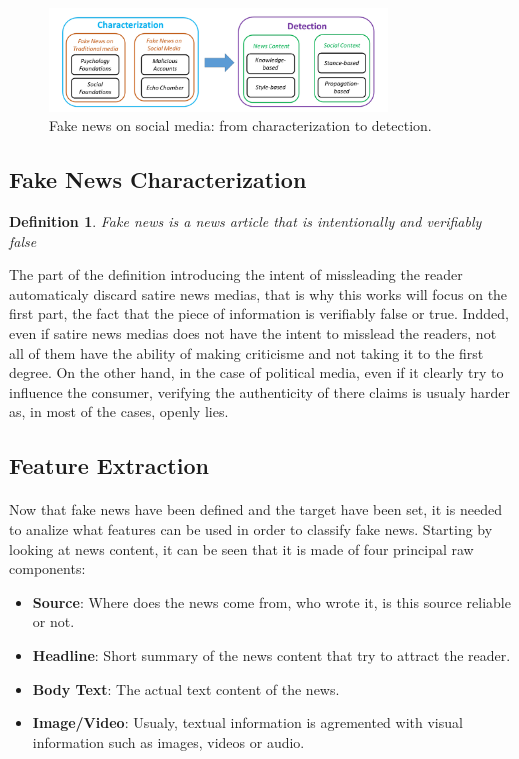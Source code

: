 \begin{figure}
	\centering
	\includegraphics[width=0.8\textwidth]{chapter/images/introduction/characterization.png}
	\caption{Fake news on social media: from characterization to detection.\cite{shu2017fake}}
	\label{fig:intro:characterization}
\end{figure}

\subsection{Fake News Characterization}
\newtheorem{def:fake_news}{Definition}

\begin{def:fake_news}
Fake news is a news article that is intentionally and verifiably false
\end{def:fake_news}

The part of the definition introducing the intent of missleading the reader automaticaly discard satire news medias, that is why this works will focus on the first part, the fact that the piece of information is verifiably false or true. Indded, even if satire news medias does not have the intent to misslead the readers, not all of them have the ability of making criticisme and not taking it to the first degree. On the other hand, in the case of political media, even if it clearly try to influence the consumer, verifying the authenticity of there claims is usualy harder as, in most of the cases, openly lies. 

\subsection{Feature Extraction}
\paragraph{} Now that fake news have been defined and the target have been set, it is needed to analize what features can be used in order to classify fake news. Starting by looking at news content, it can be seen that it is made of four principal raw components: 
\begin{itemize}
	\item \textbf{Source}: Where does the news come from, who wrote it, is this source reliable or not.
	\item \textbf{Headline}: Short summary of the news content that try to attract the reader.
	\item \textbf{Body Text}: The actual text content of the news.
	\item \textbf{Image/Video}: Usualy, textual information is agremented with visual information such as images, videos or audio.  
\end{itemize}

